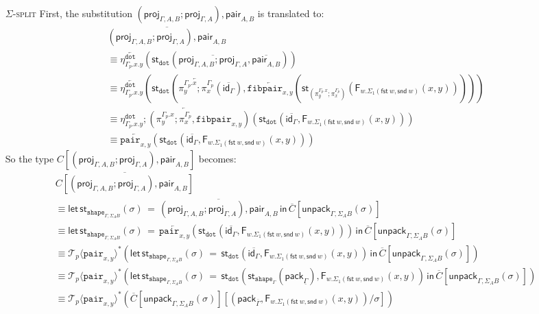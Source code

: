\documentclass[10pt]{article}
\theoremstyle{definition}
\newcommand\dsd[1]{\ensuremath{\mathsf{#1}}}
\newcommand{\app}[2]{\ensuremath{#1 \: #2}}
\newcommand{\fst}[1]{\app{\dsd{fst}}{#1}}
\newcommand{\snd}[1]{\app{\dsd{snd}}{#1}}
\newcommand{\id}{\mathsf{id}}
\newcommand{\rewrite}[2]{\overleftarrow{#1}(#2)}
\newcommand\St[2]{\ensuremath{{#1}^*(#2)}}
\newcommand\StI[2]{\ensuremath{\mathsf{st}_{#1}(#2)}}
\newcommand\StE[4]{\ensuremath{\mathsf{let} \, \StI{#1}{#3} \, = \, {#2} \, \mathsf{in} \, #4}}
\newcommand\FIs[2]{\ensuremath{\mathsf{F}_{#1}{(#2)}}}
\newcommand\ApEl[2]{\mathcal{T}_{#1}\langle#2\rangle}
\newcommand\pack[1]{\ensuremath{\mathsf{pack}_{#1}}}
\newcommand\unpack[2]{\ensuremath{\mathsf{unpack}_{#1}(#2)}}
\newcommand{\modeof}[1]{{#1}_p}
\newcommand{\tdot}{\ensuremath{\mathtt{dot}}}
\newcommand{\tshape}[1]{\ensuremath{\mathtt{shape}_{#1}}}
\newcommand{\upstairs}[1]{\overline{#1}}
\newcommand{\downstairs}[1]{\underline{#1}}
\newcommand\proj[1]{\ensuremath{\mathsf{proj}_{#1}}}
\newcommand\fibpair[1]{\ensuremath{\mathtt{fibpair}_{#1}}}
\newcommand\pair[1]{\ensuremath{\mathtt{pair}_{#1}}}
\newcommand\qpair[1]{\ensuremath{\mathsf{pair}_{#1}}}
\begin{document}
\begin{enumerate}[style = multiline, labelwidth = 80pt]
\item[\textsc{$\Sigma$-split}] 
First, the substitution $(\proj{\Gamma, A, B};\proj{\Gamma, A}), \qpair{A,B}$ is translated to:
\begin{align*}
&\upstairs{(\proj{\Gamma, A, B};\proj{\Gamma, A}), \qpair{A,B}} \\
&\equiv \rewrite{\eta^\tdot_{\modeof{\Gamma}.x.y}}{\StI{\tdot}{\upstairs{\proj{\Gamma, A, B};\proj{\Gamma, A}}, \upstairs{\qpair{A,B}}}} \\
&\equiv \rewrite{\eta^\tdot_{\modeof{\Gamma}.x.y}}{\StI{\tdot}{\rewrite{\pi^{\modeof{\Gamma}.x}_y;\pi^{\modeof{\Gamma}}_x}{\upstairs{\id_\Gamma}}, \rewrite{\fibpair{x,y}}{\StI{(\pi^{\modeof{\Gamma}.x}_y;\pi^{\modeof{\Gamma}}_x)}{\FIs{w. \Sigma_1(\fst w, \snd w)}{x,y}}}}} \\
&\equiv \rewrite{\eta^\tdot_{\modeof{\Gamma}.x.y};(\pi^{\modeof{\Gamma}.x}_y;\pi^{\modeof{\Gamma}}_x,\fibpair{x,y})}{\StI{\tdot}{\upstairs{\id_\Gamma},\FIs{w. \Sigma_1(\fst w, \snd w)}{x,y}}} \\
&\equiv \rewrite{\pair{x,y}}{\StI{\tdot}{\upstairs{\id_\Gamma},\FIs{w. \Sigma_1(\fst w, \snd w)}{x,y}}}
\end{align*}
So the type $C[(\proj{\Gamma, A, B};\proj{\Gamma, A}), \qpair{A,B}]$ becomes:
\begin{align*}
&\upstairs{C[(\proj{\Gamma, A, B};\proj{\Gamma, A}), \qpair{A,B}]} \\
&\equiv \StE{\tshape{\Gamma, \Sigma_A B}}{\upstairs{(\proj{\Gamma, A, B};\proj{\Gamma, A}), \qpair{A,B}}}{\sigma}{\upstairs{C}[\unpack{\Gamma, \Sigma_A B}{\sigma}]} \\
&\equiv \StE{\tshape{\Gamma, \Sigma_A B}}{\rewrite{\pair{x,y}}{\StI{\tdot}{\upstairs{\id_\Gamma},\FIs{w. \Sigma_1(\fst w, \snd w)}{x,y}}}}{\sigma}{\upstairs{C}[\unpack{\Gamma, \Sigma_A B}{\sigma}]} \\
&\equiv \St{\ApEl{p}{\pair{x,y}}}{\StE{\tshape{\Gamma, \Sigma_A B}}{\StI{\tdot}{\upstairs{\id_\Gamma},\FIs{w. \Sigma_1(\fst w, \snd w)}{x,y}}}{\sigma}{\upstairs{C}[\unpack{\Gamma, \Sigma_A B}{\sigma}]}} \\
&\equiv \St{\ApEl{p}{\pair{x,y}}}{\StE{\tshape{\Gamma, \Sigma_A B}}{\StI{\tdot}{\StI{\tshape{\Gamma}}{\pack{\downstairs{\Gamma}}},\FIs{w. \Sigma_1(\fst w, \snd w)}{x,y}}}{\sigma}{\upstairs{C}[\unpack{\Gamma, \Sigma_A B}{\sigma}]}} \\
&\equiv \St{\ApEl{p}{\pair{x,y}}}{\upstairs{C}[\unpack{\Gamma, \Sigma_A B}{\sigma}][(\pack{\upstairs{\Gamma}},\FIs{w. \Sigma_1(\fst w, \snd w)}{x,y})/\sigma]} \\

\end{align*}
\end{enumerate}
\end{document}
